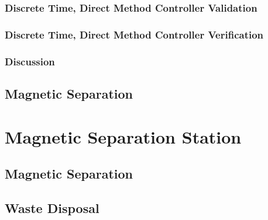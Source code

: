 \subsubsection{Discrete Time, Direct Method Controller Validation}

\subsubsection{Discrete Time, Direct Method Controller Verification}

\subsubsection{Discussion}

\subsection{Magnetic Separation}

\section{Magnetic Separation Station}

\subsection{Magnetic Separation}

\subsection{Waste Disposal}